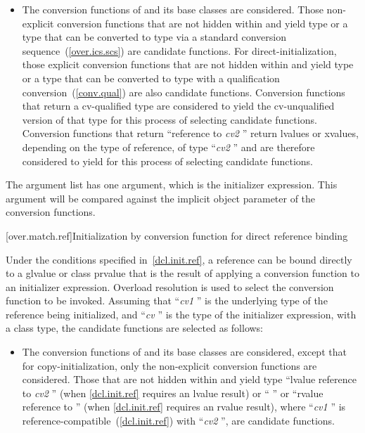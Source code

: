 \begin{itemize}
\item
The conversion functions of
and its base classes are considered.
Those non-explicit conversion functions that are not hidden
within
and yield type
or a type that can be converted to type
via a standard conversion sequence~(\ref{over.ics.scs})
are candidate functions.
For direct-initialization, those explicit conversion functions that are not
hidden within  and yield type  or a type that can be converted
to type  with a qualification conversion~(\ref{conv.qual}) are also
candidate functions.
Conversion functions that return a cv-qualified type
are considered to yield the cv-unqualified version of that type
for this process of selecting candidate functions.
Conversion functions that return ``reference to
\textit{cv2}
''
return
lvalues or xvalues, depending on the type of reference, of type
``\textit{cv2}
''
and are therefore considered to yield
for this
process of selecting candidate functions.
\end{itemize}

\pnum
The argument list has one argument, which is the initializer expression.
\enternote
This argument will be compared against
the implicit object parameter of the conversion functions.
\exitnote

[over.match.ref]{Initialization by conversion function for direct reference binding}%

\pnum
Under the conditions specified in~\ref{dcl.init.ref}, a reference can be bound directly
to a glvalue or class prvalue that is the result of applying a conversion
function to an initializer expression.
Overload resolution is used to select the
conversion function to be invoked.
Assuming that ``\textit{cv1} '' is the
underlying type of the reference being initialized, and
``\textit{cv} '' is the type
of the initializer expression, with
a class type,
the candidate functions are selected as follows:
\begin{itemize}
\item
The conversion functions of
and its base classes are considered, except that for copy-initialization, only
the non-explicit conversion functions are considered.
Those that are not hidden within
and yield type ``lvalue reference to \textit{cv2} ''
(when \ref{dcl.init.ref} requires an lvalue result) or `` ''
or ``rvalue reference to  '' (when \ref{dcl.init.ref}
requires an rvalue result),
where ``\textit{cv1} '' is reference-compatible~(\ref{dcl.init.ref})
with ``\textit{cv2} '',
are candidate functions.
\end{itemize}

